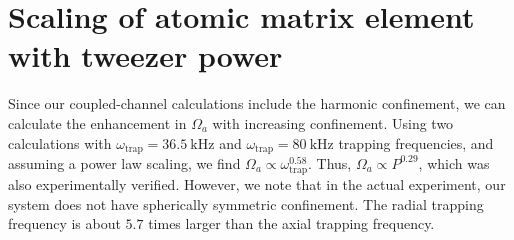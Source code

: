 \documentclass[aps,secnumarabic,amsmath,amssymb,10pt,superscriptaddress]{revtex4}
\newcommand{\todo}[1]{}
\begin{document}
\section{Scaling of atomic matrix element with tweezer power}

Since our coupled-channel calculations include the harmonic confinement, we can calculate the enhancement in $\Omega_a$ with increasing confinement. Using two calculations with $ \omega_{\text{trap}} = 36.5~\mathrm{kHz}$ and $\omega_{\text{trap}} = 80~\mathrm{kHz}$ trapping frequencies, and assuming a power law scaling, we find $ \Omega_a \propto \omega_{\text{trap}}^{0.58} $. Thus, $\Omega_a \propto P^{0.29} $, which was also experimentally verified. However, we note that in the actual experiment, our system does not have spherically symmetric confinement. The radial trapping frequency is about $5.7$ times larger than the axial trapping frequency.
\todo{
  Power/intensity calibration
}


\end{document}
